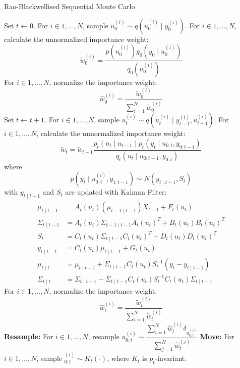 \begin{algorithm}
\caption{Rao-Blackwellised Sequential Monte Carlo}\label{algo:msmc}
\begin{algorithmic}[1]
\State Set $t \gets 0$.
\State For $i \in 1, \ldots, N$, sample $u^{(i)}_0 \sim q(u^{(i)}_0 \mid y^{(i)}_0)$.
\State For $i \in 1, \ldots, N$, calculate the unnormalized importance weight:
\begin{equation*}
 \tilde{w}^{(i)}_0 = \dfrac{p(u_0^{(i)})g_0(y_0 \mid u^{(i)}_0)}{q_0(u^{(i)}_0)}
\end{equation*}
\State For $i \in 1, \ldots, N$, normalize the importance weight:
\begin{equation*}
\hat{w}^{(i)}_0 = \dfrac{\tilde{w}^{(i)}_0}{\sum^N_{i=1} \tilde{w}^{(i)}_0}
\end{equation*}
\State Set $t \gets t + 1$.
\State For $i \in 1, \ldots, N$, sample $u^{(i)}_t \sim q(u^{(i)}_t \mid y^{(i)}_{t-1}, u^{(i)}_{t-1})$.
\State For $i \in 1, \ldots, N$, calculate the unnormalized importance weight:
\begin{equation*}
   \tilde{w}_t  = \tilde{w}_{t-1} \dfrac{p_t(u_t \mid u_{t-1})p_t(y_t \mid u_{0:t}, y_{0:t-1})}{q_t(u_t \mid u_{0:t-1}, y_{0:t})}
\end{equation*}
where
\begin{equation}
  p(y_t \mid u^{(i)}_{0:t}, y_{1:t-1}) \sim N(y_{t \mid t-1},S_t)
\end{equation}
with $y_{t \mid t-1}$ and $S_t$ are updated with Kalman Filter:
\begin{align}
  \mu_{t \mid t -1} &= A_{t}(u_t)(\mu_{t-1 \mid t-1})X_{t-1} + F_t(u_t) \nonumber \\
  \Sigma_{t \mid t -1} &= A_{t}(u_t)\Sigma_{t -1 \mid t -1}A_{t}(u_t)^T +  B_t(u_t)B_t(u_t)^T \nonumber\\
  S_t &=  C_{t}(u_t)\Sigma_{t \mid t -1}C_{t}(u_t)^T +  D_t(u_t)D_t(u_t)^T \nonumber\\
  y_{t \mid t-1} &=  C_{t}(u_t)  \mu_{t \mid t-1} + G_t(u_t) \nonumber\\
  \mu_{t \mid t} &=   \mu_{t \mid t -1} +   \Sigma_{t \mid t -1} C_{t}(u_t)S_t^{-1}(y_t - y_{t \mid t-1}) \nonumber\\
  \Sigma_{t \mid t} &=  \Sigma_{t \mid t -1} -\Sigma_{t \mid t -1} C_{t}(u_t)S_t^{-1} C_{t}(u_t)\Sigma_{t \nonumber \mid t -1}
\end{align}
\State For $i \in 1, \ldots, N$, normalize the importance weight:
\begin{equation*}
\hat{w}^{(i)}_t = \dfrac{\tilde{w}^{(i)}_t}{\sum^N_{i=1} \tilde{w}^{(i)}_t}
\end{equation*}
\State \textbf{Resample:} For $i \in 1, \ldots, N$, resample $ u^{(i)}_{0:t} \sim \dfrac{\sum^N_{i=1}\hat{w}^{(i)}_t\delta_{u^{(i)}_{0:t}}}{\sum^N_{j=1} \hat{w}^{(j)}_t}$
\State \textbf{Move:} For $i \in 1, \ldots, N$, sample $^{(i)}_{0:t} \sim K_t(\cdot)$, where $K_t$ is $p_t$-invariant.
\EndWhile
\EndFunction
\end{algorithmic}
\end{algorithm}

